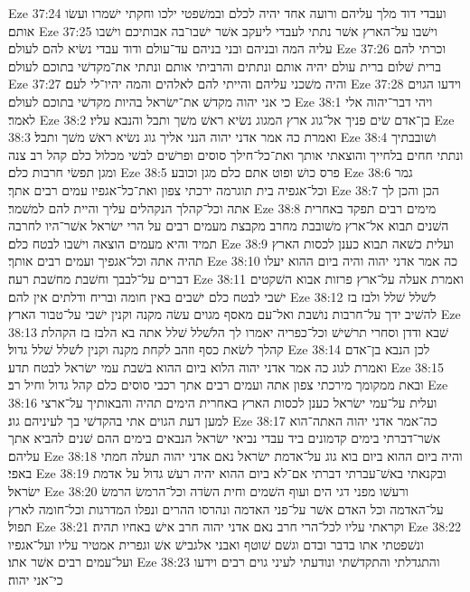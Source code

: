 Eze 37:24  ועבדי דוד מלך עליהם ורועה אחד יהיה לכלם ובמשׁפטי ילכו וחקתי ישׁמרו ועשׂו אותם׃
Eze 37:25  וישׁבו על־הארץ אשׁר נתתי לעבדי ליעקב אשׁר ישׁבו־בה אבותיכם וישׁבו עליה המה ובניהם ובני בניהם עד־עולם ודוד עבדי נשׂיא להם לעולם׃
Eze 37:26  וכרתי להם ברית שׁלום ברית עולם יהיה אותם ונתתים והרביתי אותם ונתתי את־מקדשׁי בתוכם לעולם׃
Eze 37:27  והיה משׁכני עליהם והייתי להם לאלהים והמה יהיו־לי לעם׃
Eze 37:28  וידעו הגוים כי אני יהוה מקדשׁ את־ישׂראל בהיות מקדשׁי בתוכם לעולם׃
Eze 38:1  ויהי דבר־יהוה אלי לאמר׃
Eze 38:2  בן־אדם שׂים פניך אל־גוג ארץ המגוג נשׂיא ראשׁ משׁך ותבל והנבא עליו׃
Eze 38:3  ואמרת כה אמר אדני יהוה הנני אליך גוג נשׂיא ראשׁ משׁך ותבל׃
Eze 38:4  ושׁובבתיך ונתתי חחים בלחייך והוצאתי אותך ואת־כל־חילך סוסים ופרשׁים לבשׁי מכלול כלם קהל רב צנה ומגן תפשׂי חרבות כלם׃
Eze 38:5  פרס כושׁ ופוט אתם כלם מגן וכובע׃
Eze 38:6  גמר וכל־אגפיה בית תוגרמה ירכתי צפון ואת־כל־אגפיו עמים רבים אתך׃
Eze 38:7  הכן והכן לך אתה וכל־קהלך הנקהלים עליך והיית להם למשׁמר׃
Eze 38:8  מימים רבים תפקד באחרית השׁנים תבוא אל־ארץ משׁובבת מחרב מקבצת מעמים רבים על הרי ישׂראל אשׁר־היו לחרבה תמיד והיא מעמים הוצאה וישׁבו לבטח כלם׃
Eze 38:9  ועלית כשׁאה תבוא כענן לכסות הארץ תהיה אתה וכל־אגפיך ועמים רבים אותך׃
Eze 38:10  כה אמר אדני יהוה והיה ביום ההוא יעלו דברים על־לבבך וחשׁבת מחשׁבת רעה׃
Eze 38:11  ואמרת אעלה על־ארץ פרזות אבוא השׁקטים ישׁבי לבטח כלם ישׁבים באין חומה ובריח ודלתים אין להם׃
Eze 38:12  לשׁלל שׁלל ולבז בז להשׁיב ידך על־חרבות נושׁבת ואל־עם מאסף מגוים עשׂה מקנה וקנין ישׁבי על־טבור הארץ׃
Eze 38:13  שׁבא ודדן וסחרי תרשׁישׁ וכל־כפריה יאמרו לך הלשׁלל שׁלל אתה בא הלבז בז הקהלת קהלך לשׂאת כסף וזהב לקחת מקנה וקנין לשׁלל שׁלל גדול׃
Eze 38:14  לכן הנבא בן־אדם ואמרת לגוג כה אמר אדני יהוה הלוא ביום ההוא בשׁבת עמי ישׂראל לבטח תדע׃
Eze 38:15  ובאת ממקומך מירכתי צפון אתה ועמים רבים אתך רכבי סוסים כלם קהל גדול וחיל רב׃
Eze 38:16  ועלית על־עמי ישׂראל כענן לכסות הארץ באחרית הימים תהיה והבאותיך על־ארצי למען דעת הגוים אתי בהקדשׁי בך לעיניהם גוג׃
Eze 38:17  כה־אמר אדני יהוה האתה־הוא אשׁר־דברתי בימים קדמונים ביד עבדי נביאי ישׂראל הנבאים בימים ההם שׁנים להביא אתך עליהם׃
Eze 38:18  והיה ביום ההוא ביום בוא גוג על־אדמת ישׂראל נאם אדני יהוה תעלה חמתי באפי׃
Eze 38:19  ובקנאתי באשׁ־עברתי דברתי אם־לא ביום ההוא יהיה רעשׁ גדול על אדמת ישׂראל׃
Eze 38:20  ורעשׁו מפני דגי הים ועוף השׁמים וחית השׂדה וכל־הרמשׂ הרמשׂ על־האדמה וכל האדם אשׁר על־פני האדמה ונהרסו ההרים ונפלו המדרגות וכל־חומה לארץ תפול׃
Eze 38:21  וקראתי עליו לכל־הרי חרב נאם אדני יהוה חרב אישׁ באחיו תהיה׃
Eze 38:22  ונשׁפטתי אתו בדבר ובדם וגשׁם שׁוטף ואבני אלגבישׁ אשׁ וגפרית אמטיר עליו ועל־אגפיו ועל־עמים רבים אשׁר אתו׃
Eze 38:23  והתגדלתי והתקדשׁתי ונודעתי לעיני גוים רבים וידעו כי־אני יהוה׃
